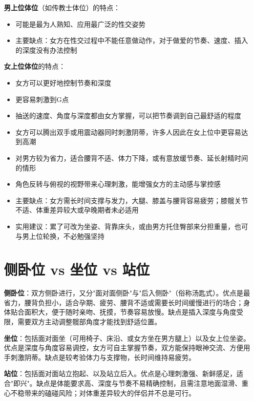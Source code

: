 \documentclass[12pt,UTF8]{ctexbook}
\begin{document}
\noindent\textbf{男上位体位}（如传教士体位）的特点：
\begin{itemize}
	\item 可能是最为人熟知、应用最广泛的性交姿势
	\item 主要缺点：女方在性交过程中不能任意做动作，对于做爱的节奏、速度、插入的深度没有办法控制
\end{itemize}

\noindent\textbf{女上位体位}的特点：
\begin{itemize}
	\item 女方可以更好地控制节奏和深度
	\item 更容易刺激到G点
	\item 抽送的速度、角度与深度都由女方掌握，可以把节奏调到自己最舒适的程度
	\item 女方可以腾出双手或用震动器同时刺激阴蒂，许多人因此在女上位中更容易达到高潮
	\item 对男方较为省力，适合腰背不适、体力下降，或有意放缓节奏、延长射精时间的情形
	\item 角色反转与俯视的视野带来心理刺激，能增强女方的主动感与掌控感
	\item 主要缺点：女方需长时间支撑与发力，大腿、膝盖与腰背容易疲劳；膝髋关节不适、体重差异较大或孕晚期者未必适用
	\item 实用建议：累了可改为坐姿、背靠床头，或由男方托住臀部来分担重量，也可与男上位轮换，不必勉强坚持
\end{itemize}

\vspace{0.5em}
\section{侧卧位 vs 坐位 vs 站位}

\noindent\textbf{侧卧位}：双方侧卧进行，又分"面对面侧卧"与"后入侧卧"（俗称汤匙式）。优点是最省力，腰背负担小，适合孕期、疲劳、腰背不适或需要长时间缓慢进行的场合；身体贴合面积大，便于随时亲吻、抚摸，节奏容易放慢。缺点是插入深度与角度受限，需要双方主动调整髋部角度才能找到舒适位置。

\noindent\textbf{坐位}：包括面对面坐（可用椅子、床沿、或女方坐在男方腿上）以及女上位坐姿。优点是深度与角度容易调控，女方可自主掌握节奏，双方能保持眼神交流、方便用手刺激阴蒂。缺点是较考验体力与支撑物，长时间维持易疲劳。

\noindent\textbf{站位}：包括面对面站立抱起、以及站立后入。优点是心理刺激强、新鲜感足，适合"即兴"。缺点是体能要求高、深度与节奏不易精确控制，且需注意地面湿滑、重心不稳带来的磕碰风险；对体重差异较大的伴侣并不总是可行。
\end{document}
